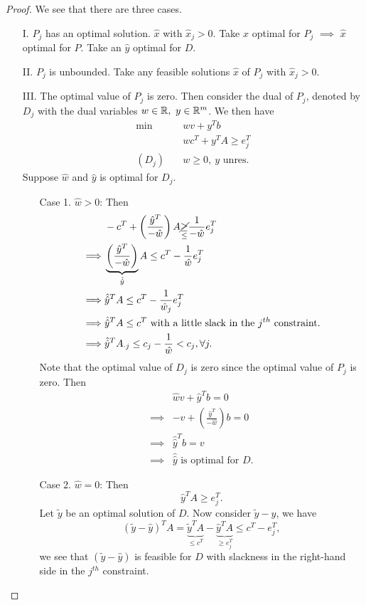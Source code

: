 \begin{proof}
	We see that there are three cases.
	\begin{enumerate}
		\item[I.] \(P_{j}\) has an optimal solution. \(\hat{x}\) with \(\hat{x}_j>0\). Take \(\hat{x}\) optimal for \(P_{j}\)
			\(\implies\) \(\hat{x}\) optimal for \(P\). Take an \(\hat{y}\) optimal for \(D\).
		\item[II.] \(P_{j}\) is unbounded. Take any feasible solutions \(\hat{x}\) of \(P_{j}\) with \(\hat{x}_j>0\).
		\item[III.] The optimal value of \(P_{j}\) is zero. Then consider the dual of \(P_{j}\), denoted by \(D_{j}\) with the dual variables \(w\in\mathbb{\MakeUppercase{R}},\ y\in\mathbb{\MakeUppercase{R}}^m\).
			We then have
			\begin{align*}
				\min~        & wv + y^{T}b                  \\
				             & wc^{T}+y^{T}A \geq e_{j}^{T} \\
				(D_{j})\quad & w\geq 0,\ y \text{ unres.}
			\end{align*}
			Suppose \(\hat{w}\) and \(\hat{y}\) is optimal for \(D_{j}\).
			\begin{enumerate}
				\item[Case 1.] \(\hat{w}>0\): Then
					\[
						\begin{split}
							&-c^{T} + \left( \frac{\hat{y}^{T}}{-\hat{w}} \right)A\underset{\leq }{\cancel{\geq}} \frac{1}{-\hat{w}} e_{j}^{T}\\
							\implies&\underbrace{\left( \frac{\hat{y}^{T}}{-\hat{w}} \right)}_{\hat{\hat{y}}} A\leq c^{T} -  \frac{1}{\hat{w}} e_{j}^{T}\\
							\implies&\hat{\hat{y}}^{T}A\leq c^{T} - \frac{1}{\hat{w}_j}e_{j}^{T}\\
							\implies&\hat{\hat{y}}^{T}A\leq c^{T} \text{ with a little slack in the \(j^{th}\) constraint.}\\
							\implies&\hat{\hat{y}}^{T}A_{\cdot j}\leq c_{j} - \frac{1}{\hat{w}}<c_{j}, \forall j.
						\end{split}
					\]
					Note that the optimal value of \(D_{j}\) is zero since the optimal value of \(P_{j}\) is zero. Then
					\[
						\begin{split}
							&\hat{w} v + \hat{y}^{T}b = 0\\
							\implies& -v + \left( \frac{\hat{y}^{T}}{-\hat{w}} \right) b = 0\\
							\implies& \hat{\hat{y}}^{T}b = v\\
							\implies& \hat{\hat{y}} \text{ is optimal for }D.
						\end{split}
					\]
				\item[Case 2.] \(\hat{w} = 0\): Then
					\[
						\hat{y}^{T}A\geq e_{j}^{T}.
					\]
					Let \(\widetilde{y}\) be an optimal solution of \(D\). Now consider \(\widetilde{y} - \hat{y}\), we have
					\[
						\left(\widetilde{y} - \hat{y}\right)^{T}A = \underbrace{\widetilde{y}^{T}A}_{\leq c^{T}} - \underbrace{\hat{y}^{T}A}_{\geq e_{j}^{T}} \leq c^{T} - e_{j}^{T},
					\]
					we see that \(\left( \widetilde{y} - \hat{y} \right) \) is feasible for \(D\) with slackness in the right-hand side in the \(j^{th}\) constraint.


\end{enumerate}
\end{enumerate}
\end{proof}
